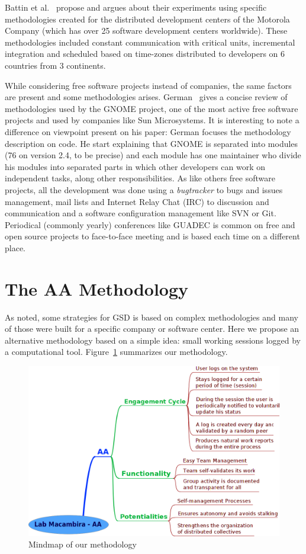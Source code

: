 \documentclass[letterpaper]{article}
\begin{document}
Battin et al.~\cite{battin2001} propose and argues about their
experiments using specific methodologies created for the distributed
development centers of the Motorola Company (which has over 25
software development centers worldwide). These methodologies included
constant communication with critical units, incremental integration
and scheduled based on time-zones distributed to developers on 6
countries from 3 continents.

While considering free software projects instead of companies, the
same factors are present and some methodologies
arises. German~\cite{german2003} gives a concise review of
methodologies used by the GNOME project, one of the most active free
software projects and used by companies like Sun Microsystems. It is
interesting to note a difference on viewpoint present on his paper:
German focuses the methodology description on code. He start explaining
that GNOME is separated into modules (76 on version 2.4, to be
precise) and each module has one maintainer who divide his modules
into separated parts in which other developers can work on independent
tasks, along other responsibilities. As like others free software
projects, all the development was done using a \emph{bugtracker} to
bugs and issues management, mail lists and Internet Relay Chat (IRC)
to discussion and communication and a software configuration
management like SVN or Git. Periodical (commonly yearly) conferences
like GUADEC is common on free and open source projects to face-to-face
meeting and is based each time on a different place.




\section{The AA Methodology}
\label{aa-methodology}

As noted, some strategies for GSD is based on complex methodologies
and many of those were built for a specific company or software
center. Here we propose an alternative methodology based on a simple
idea: small working sessions logged by a computational
tool. Figure~\ref{fig:mm} summarizes our methodology.

\begin{figure}
\begin{center}
   \includegraphics[width=0.8\linewidth,keepaspectratio=true]{figs/aa-mm.png}
\end{center}
   \caption{
   Mindmap of our methodology
   }
\label{fig:mm}
\end{figure}
\end{document}
